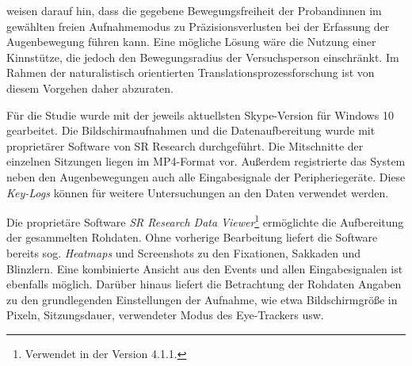 
\citet[240]{balling_evidence_2014} weisen darauf hin, dass die gegebene Bewegungsfreiheit der Proband{\textperiodcentered}innen im gewählten freien Aufnahmemodus zu Präzisionsverlusten bei der Erfassung der Augenbewegung führen kann. Eine mögliche Lösung wäre die Nutzung einer Kinnstütze, die jedoch den Bewegungsradius der Versuchsperson einschränkt. Im Rahmen der naturalistisch orientierten Translationsprozessforschung ist von diesem Vorgehen daher abzuraten.

Für die Studie wurde mit der jeweils aktuellsten Skype-Version für Windows 10 gearbeitet. Die Bildschirmaufnahmen und die Datenaufbereitung wurde mit proprietärer Software von SR Research durchgeführt. Die Mitschnitte der einzelnen Sitzungen liegen im MP4-Format vor. Außerdem registrierte das System neben den Augenbewegungen auch alle Eingabesignale der Peripheriegeräte. Diese \emph{Key-Logs} können für weitere Untersuchungen an den Daten verwendet werden.

Die proprietäre Software \emph{SR Research Data Viewer}\footnote{Verwendet in der Version 4.1.1.} ermöglichte die Aufbereitung der gesammelten Rohdaten. Ohne vorherige Bearbeitung liefert die Software bereits sog. \emph{Heatmaps} und Screenshots zu den Fixationen, Sakkaden und Blinzlern. Eine kombinierte Ansicht aus den Events und allen Eingabesignalen ist ebenfalls möglich. Darüber hinaus liefert die Betrachtung der Rohdaten Angaben zu den grundlegenden Einstellungen der Aufnahme, wie etwa Bildschirmgröße in Pixeln, Sitzungsdauer, verwendeter Modus des Eye-Trackers usw.

